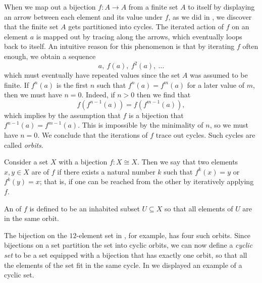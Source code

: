 When we map out a bijection $f:A\to A$ from a finite set $A$ to itself by displaying an arrow between each element and its value under $f$, as we did in , we discover that the finite set $A$ gets partitioned into cycles. The iterated action of $f$ on an element $a$ is mapped out by tracing along the arrows, which eventually loops back to itself. An intuitive reason for this phenomenon is that by iterating $f$ often enough, we obtain a sequence
\begin{equation*}
  a,~f(a),~f^2(a),~\ldots
\end{equation*}
which must eventually have repeated values since the set $A$ was assumed to be finite. If $f^n(a)$ is the first $n$ such that $f^n(a)=f^m(a)$ for a later value of $m$, then we must have $n=0$. Indeed, if $n>0$ then we find that
\begin{equation*}
  f(f^{n-1}(a))=f(f^{m-1}(a)),
\end{equation*}
which implies by the assumption that $f$ is a bijection that $f^{n-1}(a)=f^{m-1}(a)$. This is impossible by the minimality of $n$, so we must have $n=0$. We conclude that the iterations of $f$ trace out cycles. Such cycles are called \emph{orbits}.

\begin{definition}
  Consider a set $X$ with a bijection $f:X\cong X$. Then we say that two elements $x,y\in X$ are  of $f$ if there exists a natural number $k$ such that $f^k(x)=y$ or $f^k(y)=x$; that is, if one can be reached from the other by iteratively applying $f$.

  An  of $f$ is defined to be an inhabited subset $U\subseteq X$ so that all elements of $U$ are in the same orbit.
\end{definition}

The bijection on the $12$-element set in , for example, has four such orbits. Since bijections on a set partition the set into cyclic orbits, we can now define a \emph{cyclic set} to be a set equipped with a bijection that has exactly one orbit, so that all the elements of the set fit in the same cycle. In  we displayed an example of a cyclic set.

